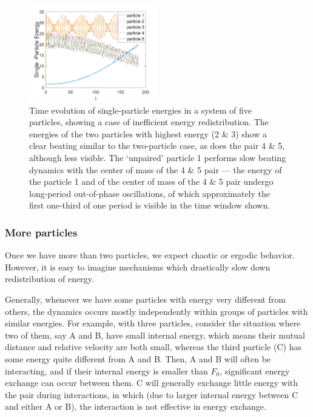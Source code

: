 \documentclass[a4paper, onecolumn]{revtex4-1}
\begin{document}
\begin{figure}[tb]
\centering
\includegraphics[width=0.5\textwidth]{N_5_F0_unknown_E_100_Single_Particle_Energy.pdf}
\caption{Time evolution of single-particle energies in a system of five particles, showing a case of
  inefficient energy redistribution.  The energies of the two particles with highest energy (2 \& 3)
  show a clear beating similar to the two-particle case, as does the pair 4 \& 5, although less
  visible.  The `unpaired' particle 1 performs slow beating dynamics with the center of mass of the
  4 \& 5 pair --- the energy of the particle 1 and of the center of mass of the 4 \& 5 pair undergo
  long-period out-of-phase oscillations, of which approximately the first one-third of one period is
  visible in the time window shown.}
\label{fig:thermalization4}
\end{figure}



\subsubsection{More particles}

Once we have more than two particles, we expect chaotic or ergodic behavior.  However, it is easy to
imagine mechanisms which drastically slow down redistribution of energy.

Generally, whenever we have some particles with energy very different from others, the dynamics
occurs mostly independently within groups of particles with similar energies.  For example, with
three particles, consider the situation where two of them, say A and B, have small internal energy,
which means their mutual distance and relative velocity are both small, whereas the third particle
(C) has some energy quite different from A and B.
%
Then, A and B will often be interacting, and if their internal energy is smaller than $F_0$,
significant energy exchange can occur between them.  C will generally exchange little energy with
the pair during interactions, in which (due to larger internal energy between C and either A or B),
the interaction is not effective in energy exchange.
\end{document}

